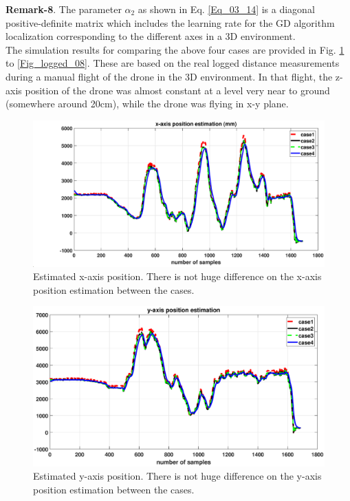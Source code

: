 \documentclass{article}
\begin{document}
\textbf{Remark-8}. The parameter $\alpha_2$ as shown in Eq. \ref{Eq_03_14} is a diagonal positive-definite matrix which includes the learning rate for the GD algorithm localization corresponding to the different axes in a 3D environment. \\

The simulation results for comparing the above four cases are provided in Fig. \ref{Fig_logged_01} to \ref{Fig_logged_08}.
These are based on the real logged distance measurements during a manual flight of the drone in the 3D environment. In that flight, the z-axis position of the drone was almost constant at a level very near to ground (somewhere around 20cm), while the drone was flying in x-y plane.

\begin{figure}[thpb]
\centering
\includegraphics[scale=0.4]{Pics/Fig_logged/pos_x.eps}
\caption{Estimated x-axis position. There is not huge difference on the x-axis position estimation between the cases.}
\label{Fig_logged_01}
\end{figure}

\begin{figure}[thpb]
\centering
\includegraphics[scale=0.4]{Pics/Fig_logged/pos_y.eps}
\caption{Estimated y-axis position. There is not huge difference on the y-axis position estimation between the cases.}
\label{Fig_logged_02}
\end{figure}
\end{document}
